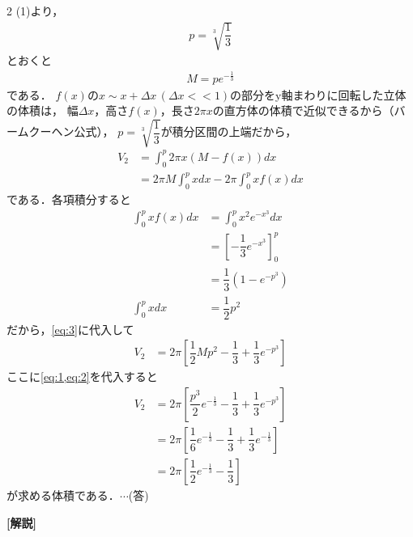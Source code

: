 \documentclass[../../main.tex]{subfiles}
\begin{document}
\begin{multicols}{2}
  (1)より，
  \begin{align}
    p=\sqrt[3]{\dfrac{1}{3}}  \label{eq:1}
  \end{align}
  とおくと
  \begin{align}
    M = p e^{-\frac{1}{3}} \label{eq:2}
  \end{align}
  である．
  $f(x)$の$x \sim x+\Delta x \, (\Delta x << 1)$の部分をy軸まわりに回転した立体の体積は，
  幅$\Delta x$，高さ$f(x)$，長さ$2\pi x$の直方体の体積で近似できるから（バームクーヘン公式），
  $p=\sqrt[3]{\dfrac{1}{3}}$が積分区間の上端だから，
  \begin{align}
    V_2
    & = \int_0^p 2\pi x(M-f(x))dx                                        \\
    & = 2\pi M\int_0^p x dx - 2\pi \int_0^p xf(x) dx \label{eq:3}
  \end{align}
  である．各項積分すると
  \begin{align}
    \int_0^p xf(x)dx
    & = \int_0^p x^2 e^{-x^3} dx              \\
    & = \left[-\dfrac{1}{3}e^{-x^3}\right]_0^p \\
    & = \dfrac{1}{3}\left(1-e^{-p^3}\right)    \\
    \int_0^p xdx & = \dfrac{1}{2}p^2
  \end{align}
  だから，\cref{eq:3}に代入して
  \begin{align}
    V_2
    & = 2\pi \left[\dfrac{1}{2}Mp^2 - \dfrac{1}{3} + \dfrac{1}{3}e^{-p^3}\right]
  \end{align}
  ここに\cref{eq:1,eq:2}を代入すると
  \begin{align}
    V_2
    & = 2\pi \left[\dfrac{p^3}{2} e^{-\frac{1}{3}} - \dfrac{1}{3} + \dfrac{1}{3}e^{-p^3}\right]        \\
    & = 2\pi \left[\dfrac{1}{6} e^{-\frac{1}{3}}  - \dfrac{1}{3} + \dfrac{1}{3}e^{-\frac{1}{3}}\right] \\
    & = 2\pi \left[\dfrac{1}{2} e^{-\frac{1}{3}}  - \dfrac{1}{3} \right]
  \end{align}
  が求める体積である．$\cdots$(答)

  {\bf [解説]}

  \newpage
\end{multicols}
\end{document}
